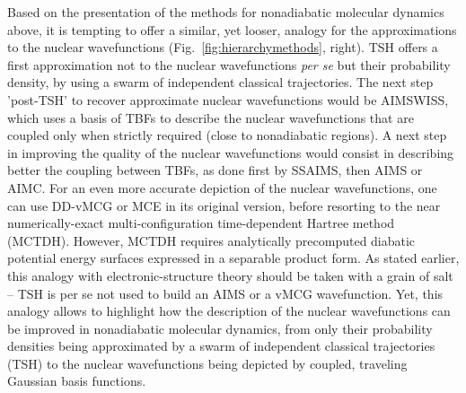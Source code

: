 \documentclass[9pt,bestpractices,pubversion]{livecoms}
\begin{document}
Based on the presentation of the methods for nonadiabatic molecular dynamics above, it is tempting to offer a similar, yet looser, analogy for the approximations to the nuclear wavefunctions (Fig.~\ref{fig:hierarchymethods}, right).\cite{lassmann2025thesis} TSH offers a first approximation not to the nuclear wavefunctions \textit{per se} but their probability density, by using a swarm of independent classical trajectories. The next step 'post-TSH' to recover approximate nuclear wavefunctions would be AIMSWISS, which uses a basis of TBFs to describe the nuclear wavefunctions that are coupled only when strictly required (close to nonadiabatic regions). A next step in improving the quality of the nuclear wavefunctions would consist in describing better the coupling between TBFs, as done first by SSAIMS, then AIMS or AIMC. For an even more accurate depiction of the nuclear wavefunctions, one can use DD-vMCG or MCE in its original version, before resorting to the near numerically-exact multi-configuration time-dependent Hartree method (MCTDH).\cite{Beck2000,mctdhnonad,gatti2014molecular} However, MCTDH requires analytically precomputed diabatic potential energy surfaces expressed in a separable product form. As stated earlier, this analogy with electronic-structure theory should be taken with a grain of salt -- TSH is per se not used to build an AIMS or a vMCG wavefunction. Yet, this analogy allows to highlight how the description of the nuclear wavefunctions can be improved in nonadiabatic molecular dynamics, from only their probability densities being approximated by a swarm of independent classical trajectories (TSH) to the nuclear wavefunctions being depicted by coupled, traveling Gaussian basis functions. 
\end{document}
